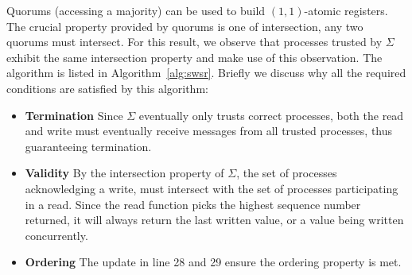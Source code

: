 Quorums (accessing a majority) can be used to build $(1, 1)$-atomic registers. The crucial property provided by quorums is
one of intersection, \ie any two quorums must intersect. For this result, we observe that processes trusted by $\Sigma$
exhibit the same intersection property and make use of this observation. The algorithm is listed in
Algorithm~\ref{alg:swsr}.
Briefly we discuss why all the required conditions are satisfied by this algorithm:
\begin{itemize}
\item \textbf{Termination} Since $\Sigma$ eventually only trusts correct processes, both the read and write must
eventually receive messages from all trusted processes, thus guaranteeing termination.
\item \textbf{Validity} By the intersection property of $\Sigma$, the set of processes acknowledging a write, must
intersect with the set of processes participating in a read. Since the read function picks the highest sequence number
returned, it will always return the last written value, or a value being written concurrently.
\item \textbf{Ordering} The update in line 28 and 29 ensure the ordering property is met.
\end{itemize}

